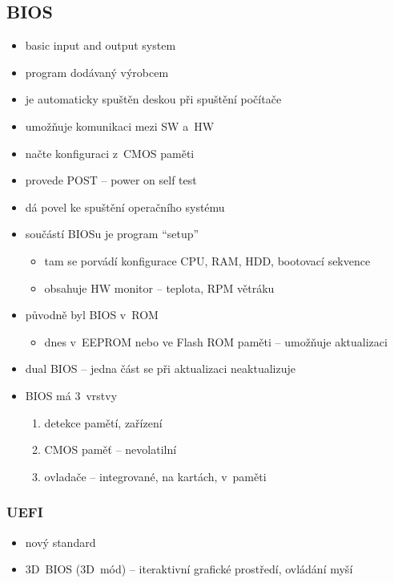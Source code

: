 \documentclass[a4paper,12pt]{article}
\providecommand{\tightlist}{%
\setlength{\itemsep}{0pt}\setlength{\parskip}{0pt}}
\begin{document}
\subsection{BIOS}

\begin{itemize}
  \tightlist
  \item basic input and output system
  \item program dodávaný výrobcem
  \item je automaticky spuštěn deskou při spuštění počítače
  \item umožňuje komunikaci mezi SW a~HW
  \item načte konfiguraci z~CMOS paměti
  \item provede POST -- power on self test
  \item dá povel ke spuštění operačního systému
  \item součástí BIOSu je program ``setup''
  \begin{itemize}
    \tightlist
    \item tam se porvádí konfigurace CPU, RAM, HDD, bootovací sekvence
    \item obsahuje HW monitor -- teplota, RPM větráku
  \end{itemize}
  \item původně byl BIOS v~ROM
  \begin{itemize}
    \tightlist
    \item dnes v~EEPROM nebo ve Flash ROM paměti -- umožňuje aktualizaci
  \end{itemize}
  \item dual BIOS -- jedna část se při aktualizaci neaktualizuje
  \item BIOS má 3~vrstvy
  \begin{enumerate}
    \item detekce pamětí, zařízení
    \item CMOS paměť -- nevolatilní
    \item ovladače -- integrované, na kartách, v~paměti
  \end{enumerate}
\end{itemize}

\subsubsection{UEFI}

\begin{itemize}
  \tightlist
  \item nový standard
  \item 3D~BIOS (3D~mód) -- iteraktivní grafické prostředí, ovládání myší
\end{itemize}
\end{document}

